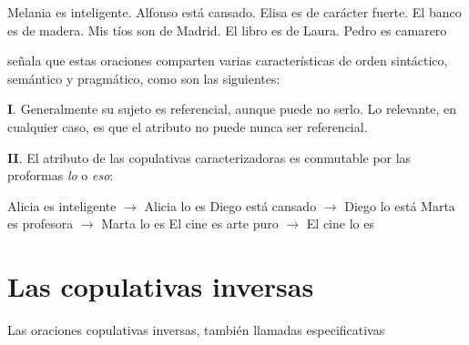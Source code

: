 \pex
\a Melania es inteligente.
\a Alfonso está cansado.
\a Elisa es de carácter fuerte.
\a El banco es de madera.
\a Mis tíos son de Madrid.
\a El libro es de Laura.
\a Pedro es camarero
\xe



{}\textcite{Leborans1999Predicacion} señala que estas oraciones comparten varias características de orden sintáctico, semántico y pragmático, como son las siguientes:


\textbf{I}. Generalmente su sujeto es referencial, aunque puede no serlo. Lo relevante, en cualquier caso, es que el atributo no puede nunca ser referencial.

\textbf{II}. El atributo de las copulativas caracterizadoras es conmutable por las proformas \textit{lo} o \textit{eso}:

\pex
\a Alicia es inteligente $\longrightarrow$ Alicia lo es
\a Diego está cansado $\longrightarrow$ Diego lo está
\a Marta es profesora $\longrightarrow$ Marta lo es
\a El cine es arte puro $\longrightarrow$ El cine lo es
\xe




\section{Las copulativas inversas}

Las oraciones copulativas inversas, también llamadas especificativas 
